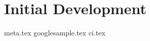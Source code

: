\chapter{Initial Development}\label{cha:initial_development}
{meta.tex}
{googlesample.tex}
{ci.tex}

